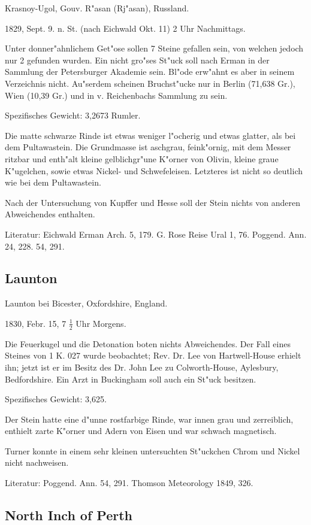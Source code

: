 \documentclass[a4paper, 11pt, oneside]{article}
\begin{document}
Krasnoy-Ugol, Gouv. R"asan (Rj"asan), Russland.

1829, Sept. 9. n. St. (nach Eichwald Okt. 11) 2 Uhr Nachmittags.

Unter donner"ahnlichem Get"ose sollen 7 Steine gefallen sein, von welchen jedoch nur 2 gefunden wurden. Ein nicht gro"ses St"uck soll nach Erman in der Sammlung der Petersburger Akademie sein. Bl"ode erw"ahnt es aber in seinem Verzeichnis nicht. Au"serdem scheinen Bruchst"ucke nur in Berlin (71,638 Gr.), Wien (10,39 Gr.) und in v. Reichenbachs Sammlung zu sein.

Spezifisches Gewicht: 3,2673 Rumler.

Die matte schwarze Rinde ist etwas weniger l"ocherig und etwas glatter, als bei dem Pultawastein. Die Grundmasse ist aschgrau, feink"ornig, mit dem Messer ritzbar und enth"alt kleine gelblichgr"une K"orner von Olivin, kleine graue K"ugelchen, sowie etwas Nickel- und Schwefeleisen. Letzteres ist nicht so deutlich wie bei dem Pultawastein.

Nach der Untersuchung von Kupffer und Hesse soll der Stein nichts von anderen Abweichendes enthalten.

Literatur: Eichwald Erman Arch. 5, 179. G. Rose Reise Ural 1, 76. Poggend. Ann. 24, 228. 54, 291.

\subsection{Launton}

Launton bei Bicester, Oxfordshire, England.

1830, Febr. 15, 7 $\frac{1}{2}$ Uhr Morgens.

Die Feuerkugel und die Detonation boten nichts Abweichendes. Der Fall eines Steines von 1 K. 027 wurde beobachtet; Rev. Dr. Lee von Hartwell-House erhielt ihn; jetzt ist er im Besitz des Dr. John Lee zu Colworth-House, Aylesbury, Bedfordshire. Ein Arzt in Buckingham soll auch ein St"uck besitzen.

Spezifisches Gewicht: 3,625.

Der Stein hatte eine d"unne rostfarbige Rinde, war innen grau und zerreiblich, enthielt zarte K"orner und Adern von Eisen und war schwach magnetisch.

Turner konnte in einem sehr kleinen untersuchten St"uckchen Chrom und Nickel nicht nachweisen.

Literatur: Poggend. Ann. 54, 291. Thomson Meteorology 1849, 326.

\subsection{North Inch of Perth}
\end{document}
